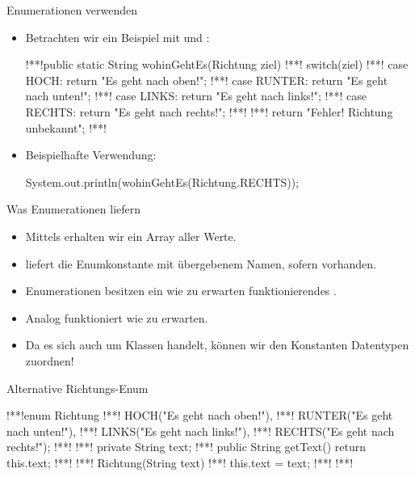 \begin{frame}[fragile]{Enumerationen verwenden}
    \begin{itemize}[<+(1)->]
        \item Betrachten wir ein Beispiel mit  und :\pause{}
\begin{plainjava}
!**!public static String wohinGehtEs(Richtung ziel){
!**!    switch(ziel) {
!**!        case HOCH:   return "Es geht nach oben!";
!**!        case RUNTER: return "Es geht nach unten!";
!**!        case LINKS:  return "Es geht nach links!";
!**!        case RECHTS: return "Es geht nach rechts!";
!**!    }
!**!    return "Fehler! Richtung unbekannt";
!**!}
\end{plainjava}
    \item<10-> Beispielhafte Verwendung:
\begin{plainjava}
System.out.println(wohinGehtEs(Richtung.RECHTS));
\end{plainjava}
    \end{itemize}
\end{frame}

\begin{frame}[fragile]{Was Enumerationen liefern}
    \begin{itemize}[<+(1)->]
        \widei
        \item Mittels  erhalten wir ein Array aller Werte.
        \item {} liefert die Enumkonstante mit übergebenem Namen,\pause{} sofern vorhanden.
        \item Enumerationen besitzen ein wie zu erwarten funktionierendes .
        \item Analog funktioniert  wie zu erwarten.
        \item Da es sich auch um Klassen handelt, können wir den Konstanten Datentypen zuordnen!
    \end{itemize}
\end{frame}

\begin{frame}[fragile,c]{Alternative Richtungs-Enum}
\begin{plainjava}
!**!enum Richtung {
!**!    HOCH("Es geht nach oben!"),
!**!    RUNTER("Es geht nach unten!"),
!**!    LINKS("Es geht nach links!"),
!**!    RECHTS("Es geht nach rechts!");
!**!
!**!    private String text;
!**!    public String getText() { return this.text; }
!**!
!**!    Richtung(String text) {
!**!        this.text = text;
!**!    }
!**!}
\end{plainjava}
\end{frame}

